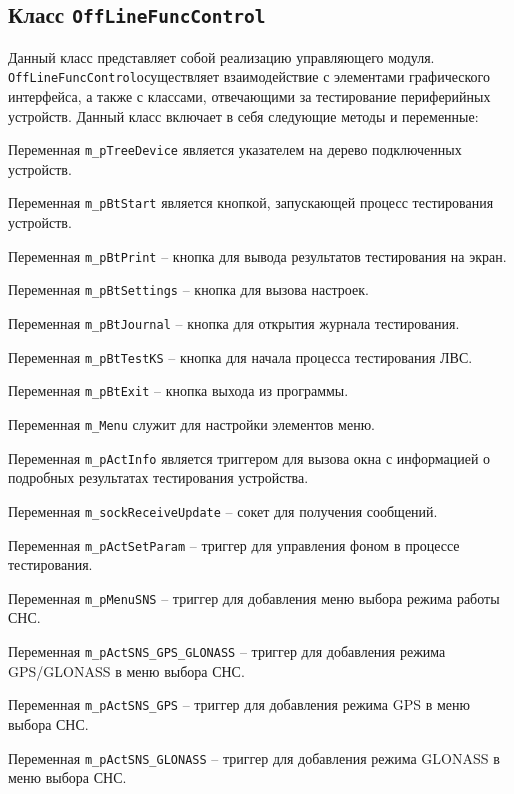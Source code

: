 \subsection{Класс \texttt{OffLineFuncControl}}
Данный класс представляет собой реализацию управляющего модуля. \texttt{OffLineFuncControl}осуществляет взаимодействие с элементами графического
интерфейса, а также с классами, отвечающими за тестирование периферийных устройств.
Данный класс включает в себя следующие методы и переменные:
\begin{enum}
	\item Переменная \texttt{m\_pTreeDevice} является указателем на дерево подключенных устройств.
	\item Переменная \texttt{m\_pBtStart} является кнопкой, запускающей процесс тестирования устройств.
	\item Переменная \texttt{m\_pBtPrint} -- кнопка для вывода результатов тестирования на экран.
	\item Переменная \texttt{m\_pBtSettings} -- кнопка для вызова настроек.
	\item Переменная \texttt{m\_pBtJournal} -- кнопка для открытия журнала тестирования.
	\item Переменная \texttt{m\_pBtTestKS} -- кнопка для начала процесса тестирования ЛВС.
	\item Переменная \texttt{m\_pBtExit} -- кнопка выхода из программы.

	\item Переменная \texttt{m\_Menu} служит для настройки элементов меню.
	\item Переменная \texttt{m\_pActInfo} является триггером для вызова окна с информацией о подробных результатах
		тестирования устройства.

	\item Переменная \texttt{m\_sockReceiveUpdate} -- сокет для получения сообщений.

	\item Переменная \texttt{m\_pActSetParam} -- триггер для управления фоном в процессе тестирования.
	\item Переменная \texttt{m\_pMenuSNS} -- триггер для добавления меню выбора режима работы СНС.
	\item Переменная \texttt{m\_pActSNS\_GPS\_GLONASS} -- триггер для добавления режима GPS/GLONASS в меню выбора
		СНС.
	\item Переменная \texttt{m\_pActSNS\_GPS} -- триггер для добавления режима GPS в меню выбора СНС.
	\item Переменная \texttt{m\_pActSNS\_GLONASS} -- триггер для добавления режима GLONASS в меню выбора СНС.


\end{enum}
